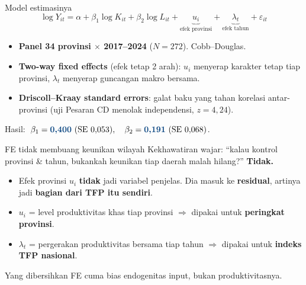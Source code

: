 \documentclass[aspectratio=169,11pt]{beamer}
\newcommand{\key}[1]{{\color{aksen}\textbf{#1}}}
\begin{document}
\begin{frame}{Model estimasinya}
  \[
    \log Y_{it} = \alpha + \beta_1 \log K_{it} + \beta_2 \log L_{it}
    + \underbrace{u_i}_{\text{efek provinsi}} + \underbrace{\lambda_t}_{\text{efek tahun}} + \varepsilon_{it}
  \]
  \vspace{0.2em}
  \begin{itemize}
    \setlength\itemsep{0.55em}
    \item \key{Panel 34 provinsi $\times$ 2017--2024} ($N=272$). Cobb--Douglas.
    \item \key{Two-way fixed effects} (efek tetap 2 arah): $u_i$ menyerap karakter
          tetap tiap provinsi, $\lambda_t$ menyerap guncangan makro bersama.
    \item \key{Driscoll--Kraay standard errors}: galat baku yang tahan korelasi
          antar-provinsi (uji Pesaran CD menolak independensi, $z=4{,}24$).
  \end{itemize}
  \vspace{0.5em}
  Hasil: $\;\beta_1 = \key{0{,}400}\ (\text{SE }0{,}053),\quad \beta_2 = \key{0{,}191}\ (\text{SE }0{,}068)$.
\end{frame}

\begin{frame}{FE tidak membuang keunikan wilayah}
  Kekhawatiran wajar: ``kalau kontrol provinsi \& tahun, bukankah keunikan tiap
  daerah malah hilang?'' \key{Tidak.}
  \vspace{0.8em}
  \begin{itemize}
    \setlength\itemsep{0.6em}
    \item Efek provinsi $u_i$ \key{tidak} jadi variabel penjelas. Dia masuk ke
          \textbf{residual}, artinya jadi \key{bagian dari TFP itu sendiri}.
    \item $u_i$ = level produktivitas khas tiap provinsi $\Rightarrow$ dipakai untuk \key{peringkat provinsi}.
    \item $\lambda_t$ = pergerakan produktivitas bersama tiap tahun $\Rightarrow$ dipakai untuk \key{indeks TFP nasional}.
  \end{itemize}
  \vspace{0.7em}
  {\color{abu} Yang dibersihkan FE cuma bias endogenitas input, bukan produktivitasnya.}
\end{frame}
\end{document}
